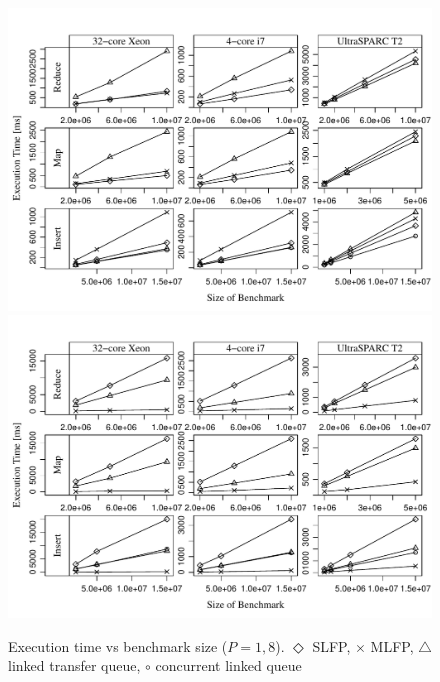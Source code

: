\documentclass[runningheads,a4paper,fleqn]{llncs}
\begin{document}
\begin{figure}
\includegraphics[width=\textwidth]{../../benchmarks/graphs/size-scaling-par1}
\includegraphics[width=\textwidth]{../../benchmarks/graphs/size-scaling-par8}
\caption{Execution time vs benchmark size ($P = 1, 8$).
  $\Diamond$ SLFP,
  $\times$ MLFP,
  $\triangle$ linked transfer queue,
  $\circ$ concurrent linked queue} \label{fig:eval-size-scaling}
\end{figure}
\end{document}
